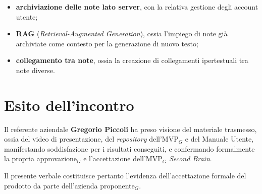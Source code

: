 \documentclass[a4paper, 10pt, colorlinks=true, linkcolor=black, urlcolor=blue, citecolor=blue, hidelinks]{article}
\begin{document}
\begin{itemize}
    \item \textbf{archiviazione delle note lato server}, con la relativa gestione degli account utente;
    \item \textbf{RAG} (\textit{Retrieval-Augmented Generation}), ossia l'impiego di note già archiviate come contesto per la generazione di nuovo testo;
    \item \textbf{collegamento tra note}, ossia la creazione di collegamenti ipertestuali tra note diverse.
\end{itemize}

\section{Esito dell'incontro}

Il referente aziendale \textbf{Gregorio Piccoli} ha preso visione del materiale trasmesso, ossia del video di presentazione, del \textit{repository} dell'MVP$_G$ e del Manuale Utente, manifestando soddisfazione per i risultati conseguiti, e confermando formalmente la propria approvazione$_G$ e l'accettazione dell'MVP$_G$ \textit{Second Brain}.

\vspace{0.3cm}

\noindent Il presente verbale costituisce pertanto l'evidenza dell'accettazione formale del prodotto da parte dell'azienda proponente$_G$.
\end{document}

